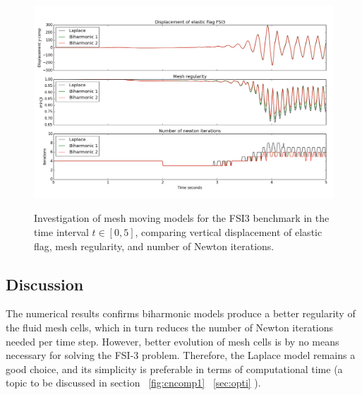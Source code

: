 \begin{figure}[h!]
        \centering
    \includegraphics[scale=0.4]{./Fig/minjcompare.png} \\
      \caption{Investigation of mesh moving models for the FSI3 benchmark in the time interval $t \in [0, 5]$, comparing vertical displacement of elastic flag, mesh regularity, and number of Newton iterations.}
      \label{fig:minjcomp}
\end{figure}

\subsection*{Discussion}
The numerical results confirms biharmonic models produce a better regularity of the fluid mesh cells, which in turn reduces the number of Newton iterations needed per time step. However,  better evolution of mesh cells is by no means necessary for solving the FSI-3 problem. Therefore, the Laplace model remains a good choice, and its simplicity is preferable in terms of computational time (a topic to be discussed in section ~\ref{fig:cncomp1} 
~\ref{sec:opti} ).
\newpage
